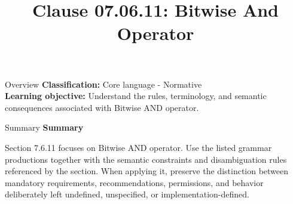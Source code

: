 \documentclass[10pt,letterpaper]{article}
\title{Clause 07.06.11: Bitwise And Operator}
\author{}
\date{}
\begin{document}
\maketitle
\begin{CornellOverviewBox}{Overview}
\textbf{Classification:} Core language - Normative\\[2pt]
\textbf{Learning objective:} Understand the rules, terminology, and semantic consequences associated with Bitwise AND operator.
\end{CornellOverviewBox}\begin{CornellSummaryBox}{Summary}
{\sffamily\bfseries\color{Accent} Summary}\par\vspace{3pt}Section 7.6.11 focuses on Bitwise AND operator. Use the listed grammar productions together with the semantic constraints and disambiguation rules referenced by the section. When applying it, preserve the distinction between mandatory requirements, recommendations, permissions, and behavior deliberately left undefined, unspecified, or implementation-defined.
\end{CornellSummaryBox}
\end{document}
